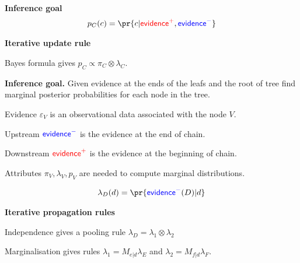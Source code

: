 \documentclass[landscape,footrule]{foils}
\newcommand{\EVPOS}{\textcolor{red}{\mathsf{evidence}^+}}
\newcommand{\EVNEG}{\textcolor{blue}{\mathsf{evidence}^-}}
\begin{document}

\vspace*{-0.0cm}
\textbf{Inference goal}
\begin{align*}
p_C(c)=\pr{c|\EVPOS,\EVNEG}
\end{align*}\vspace*{-1.5cm}


\textbf{Iterative update rule}
\begin{triangles}
\item Bayes formula gives $p_C\propto \pi_C\otimes\lambda_C$.
\end{triangles}




\textbf{Inference goal.}
Given evidence at the ends of the leafs and the root of tree find marginal posterior probabilities for each node in the tree.
\begin{triangles}
\item Evidence $\varepsilon_V$ is an observational data associated with the node $V$.
\item Upstream $\EVNEG$ is the evidence at the end of chain.
\item Downstream $\EVPOS$ is the evidence at the beginning of chain.
\item Attributes $\pi_V, \lambda_V, p_V$ are needed to compute marginal distributions. 
\end{triangles}



\vspace*{-2.5cm}

\begin{align*}
\lambda_D(d)=\pr{\EVNEG(D)|d}
\end{align*}\vspace*{-4ex}

\textbf{Iterative propagation rules}
\begin{triangles}
\item Independence gives a pooling rule $\lambda_D=\lambda_1\otimes\lambda_2$
\item Marginalisation gives rules $\lambda_1= M_{e|d}\lambda_E$ and $\lambda_2= M_{f|d}\lambda_F$.
\end{triangles}
\end{document}
